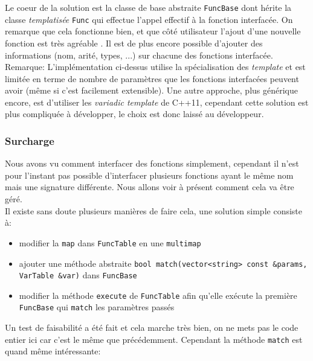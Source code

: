 \documentclass[french]{article}
\begin{document}
				Le coeur de la solution est la classe de base abstraite \texttt{FuncBase} dont hérite la classe \textit{templatisée} \texttt{Func} qui effectue l'appel effectif à la fonction interfacée. On remarque que cela fonctionne bien, et que côté utilisateur l'ajout d'une nouvelle fonction est très agréable . Il est de plus encore possible d'ajouter des informations (nom, arité, types, ...) sur chacune des fonctions interfacée.\\
				
				Remarque: L'implémentation ci-dessus utilise la spécialisation des \textit{template} et est limitée en terme de nombre de paramètres que les fonctions interfacées peuvent avoir (même si c'est facilement extensible). Une autre approche, plus générique encore, est d'utiliser les \textit{variadic template} de C++11, cependant cette solution est plus compliquée à développer, le choix est donc laissé au développeur.
				
			\subsubsection{Surcharge}
				Nous avons vu comment interfacer des fonctions simplement, cependant il n'est pour l'instant pas possible d'interfacer plusieurs fonctions ayant le même nom mais une signature différente. Nous allons voir à présent comment cela va être géré.\\
				
				Il existe sans doute plusieurs manières de faire cela, une solution simple consiste à: 
				
				\begin{itemize}
					\item modifier la \texttt{map} dans \texttt{FuncTable} en une \texttt{multimap}
					\item ajouter une méthode abstraite \texttt{bool match(vector<string> const \&params, VarTable \&var)} dans \texttt{FuncBase}
					\item modifier la méthode \texttt{execute} de \texttt{FuncTable} afin qu'elle exécute la première \texttt{FuncBase} qui \texttt{match} les paramètres passés
				\end{itemize}
				
				Un test de faisabilité a été fait et cela marche très bien, on ne mets pas le code entier ici car c'est le même que précédemment. Cependant la méthode \texttt{match} est quand même intéressante:
				
\end{document}
